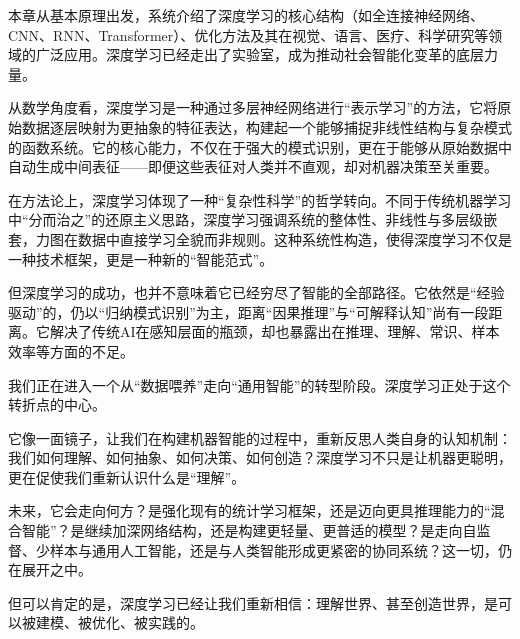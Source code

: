 本章从基本原理出发，系统介绍了深度学习的核心结构（如全连接神经网络、CNN、RNN、Transformer）、优化方法及其在视觉、语言、医疗、科学研究等领域的广泛应用。深度学习已经走出了实验室，成为推动社会智能化变革的底层力量。

从数学角度看，深度学习是一种通过多层神经网络进行“表示学习”的方法，它将原始数据逐层映射为更抽象的特征表达，构建起一个能够捕捉非线性结构与复杂模式的函数系统。它的核心能力，不仅在于强大的模式识别，更在于能够从原始数据中自动生成中间表征——即便这些表征对人类并不直观，却对机器决策至关重要。

在方法论上，深度学习体现了一种“复杂性科学”的哲学转向。不同于传统机器学习中“分而治之”的还原主义思路，深度学习强调系统的整体性、非线性与多层级嵌套，力图在数据中直接学习全貌而非规则。这种系统性构造，使得深度学习不仅是一种技术框架，更是一种新的“智能范式”。

但深度学习的成功，也并不意味着它已经穷尽了智能的全部路径。它依然是“经验驱动”的，仍以“归纳模式识别”为主，距离“因果推理”与“可解释认知”尚有一段距离。它解决了传统AI在感知层面的瓶颈，却也暴露出在推理、理解、常识、样本效率等方面的不足。

我们正在进入一个从“数据喂养”走向“通用智能”的转型阶段。深度学习正处于这个转折点的中心。

它像一面镜子，让我们在构建机器智能的过程中，重新反思人类自身的认知机制：我们如何理解、如何抽象、如何决策、如何创造？深度学习不只是让机器更聪明，更在促使我们重新认识什么是“理解”。

未来，它会走向何方？是强化现有的统计学习框架，还是迈向更具推理能力的“混合智能”？是继续加深网络结构，还是构建更轻量、更普适的模型？是走向自监督、少样本与通用人工智能，还是与人类智能形成更紧密的协同系统？这一切，仍在展开之中。

但可以肯定的是，深度学习已经让我们重新相信：理解世界、甚至创造世界，是可以被建模、被优化、被实践的。

\nocite{*}
\printbibliography[heading=bibintoc, title=\ebibname]
\appendix

\newpage